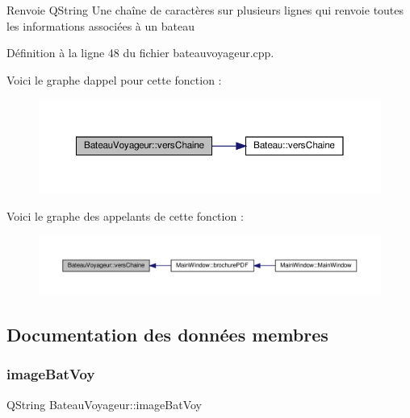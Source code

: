 \begin{DoxyReturn}{Renvoie}
Q\+String Une chaîne de caractères sur plusieurs lignes qui renvoie toutes les informations associées à un bateau 
\end{DoxyReturn}


Définition à la ligne 48 du fichier bateauvoyageur.\+cpp.

Voici le graphe d\textquotesingle{}appel pour cette fonction \+:\nopagebreak
\begin{figure}[H]
\begin{center}
\leavevmode
\includegraphics[width=350pt]{class_bateau_voyageur_a3fa14cf7db3a1a35457f1e0450d7e8b2_cgraph}
\end{center}
\end{figure}
Voici le graphe des appelants de cette fonction \+:\nopagebreak
\begin{figure}[H]
\begin{center}
\leavevmode
\includegraphics[width=350pt]{class_bateau_voyageur_a3fa14cf7db3a1a35457f1e0450d7e8b2_icgraph}
\end{center}
\end{figure}


\subsection{Documentation des données membres}
\mbox{\label{class_bateau_voyageur_aa00ee12fc973cf555a5b07cbdcf573a3}} 
\subsubsection{\texorpdfstring{image\+Bat\+Voy}{imageBatVoy}}
{\footnotesize\ttfamily Q\+String Bateau\+Voyageur\+::image\+Bat\+Voy\hspace{0.3cm}{\ttfamily [private]}}



